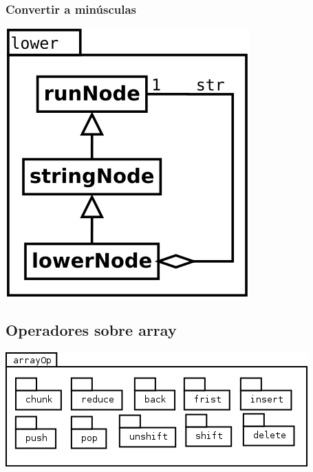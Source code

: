 \subsubsection {Convertir a minúsculas}
\begin{center}
\includegraphics[scale=0.4]{lower.png} \\
\end{center}

\pagebreak
\subsection {Operadores sobre array}
\begin{center}
\includegraphics[scale=0.4]{arrayOp-package.png} \\
\end{center}

